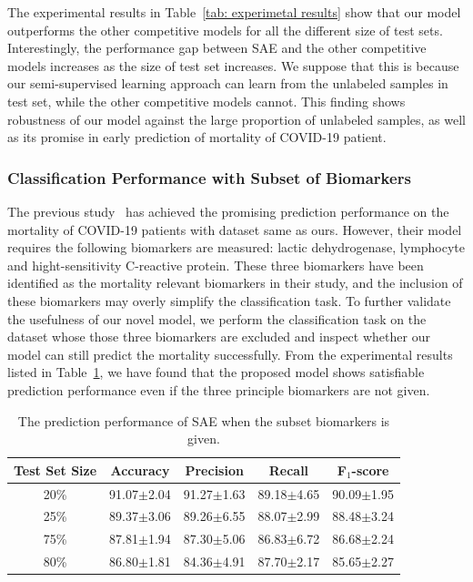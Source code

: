 The experimental results in Table~\ref{tab: experimetal results} show that our model outperforms the other competitive models for all the different size of test sets. Interestingly, the performance gap between SAE and the other competitive models increases as the size of test set increases. We suppose that this is because our semi-supervised learning approach can learn from the unlabeled samples in test set, while the other competitive models cannot. This finding shows robustness of our model against the large proportion of unlabeled samples, as well as its promise in early prediction of mortality of COVID-19 patient.

\subsubsection{Classification Performance with Subset of Biomarkers}
The previous study~\cite{yan2020interpretable} has achieved the promising prediction performance on the mortality of COVID-19 patients with dataset same as ours. However, their model requires the following biomarkers are measured: lactic dehydrogenase, lymphocyte and hight-sensitivity C-reactive protein. These three biomarkers have been identified as the mortality relevant biomarkers in their study, and the inclusion of these biomarkers may overly simplify the classification task. To further validate the usefulness of our novel model, we perform the classification task on the dataset whose those three biomarkers are excluded and inspect whether our model can still predict the mortality successfully. From the experimental results listed in Table~\ref{tab: experimetal results with the subset of biomarkers}, we have found that the proposed model shows satisfiable prediction performance even if the three principle biomarkers are not given.
\begin{table}[h]
    \centering
    \caption{The prediction performance of SAE when the subset biomarkers is given.}
    \begin{tabular}{ccccc}
    \toprule
    Test Set Size  & Accuracy & Precision & Recall & F$_1$-score \\
    \midrule
    20\%  & 91.07$\pm$2.04  & 91.27$\pm$1.63  &89.18$\pm$4.65  &90.09$\pm$1.95  \\
    25\%  & 89.37$\pm$3.06  & 89.26$\pm$6.55  &88.07$\pm$2.99  &88.48$\pm$3.24  \\
    75\%  & 87.81$\pm$1.94  & 87.30$\pm$5.06  &86.83$\pm$6.72  &86.68$\pm$2.24  \\
    80\%  & 86.80$\pm$1.81  & 84.36$\pm$4.91  &87.70$\pm$2.17  &85.65$\pm$2.27  \\
    \bottomrule
    \end{tabular}
    \label{tab: experimetal results with the subset of biomarkers}
\end{table}


